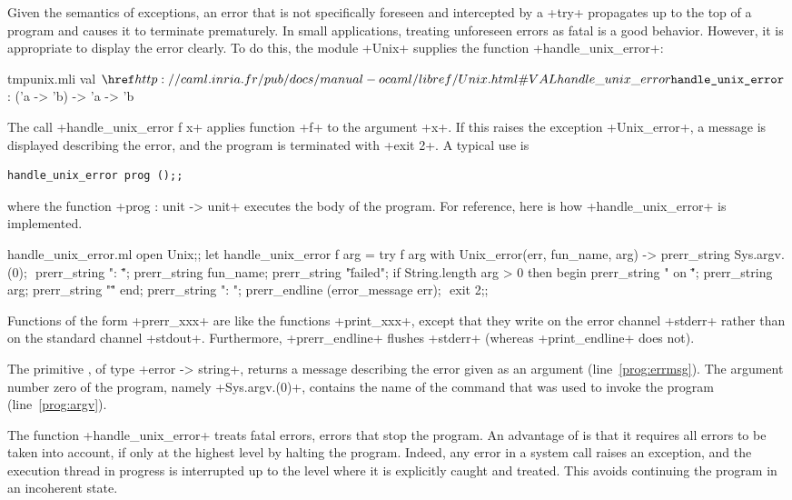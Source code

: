 Given the semantics of exceptions, an error that is not specifically
foreseen and intercepted by a \ml+try+ propagates up to the top of a
program and causes it to terminate prematurely.  In small
applications, treating unforeseen errors as fatal is a good behavior.
However, it is appropriate to display the error clearly. To do this,
the module \ml+Unix+ supplies the function \ml+handle_unix_error+:
%
\begin{listingcodefile}{tmpunix.mli}
val $\indexlibvalue{Unix}{handle\_unix\_error}$ : ('a -> 'b) -> 'a -> 'b
\end{listingcodefile}
%
The call  \ml+handle_unix_error f x+ applies function  \ml+f+ to the
argument \ml+x+. If this raises the exception \ml+Unix_error+, a
message is displayed describing the error, and the program is
terminated with  \ml+exit 2+. A typical use is
%
\begin{lstlisting}
handle_unix_error prog ();;
\end{lstlisting}
% 
where the function \ml+prog : unit -> unit+ executes the body of the
program. For reference, here is how \ml+handle_unix_error+ is
implemented.
%
\begin{listingcodefile}[style=numbers]{handle_unix_error.ml}
open Unix;;
let handle_unix_error f arg =
  try
    f arg
  with Unix_error(err, fun_name, arg) ->
    prerr_string Sys.argv.(0); $\label{prog:argv}$
    prerr_string ": \"";
    prerr_string fun_name;
    prerr_string "\" failed";
    if String.length arg > 0 then begin
      prerr_string " on \"";
      prerr_string arg;
      prerr_string "\""
    end;
    prerr_string ": ";
    prerr_endline (error_message err); $\label{prog:errmsg}$
    exit 2;;
\end{listingcodefile}
% 
Functions of the form \ml+prerr_xxx+ are like the functions
\ml+print_xxx+, except that they write on the error channel
\ml+stderr+ rather than on the standard channel \ml+stdout+.
Furthermore, \ml+prerr_endline+ flushes \ml+stderr+ (whereas
\ml+print_endline+ does not).

The primitive , of type 
\ml+error -> string+, returns a message describing the error given as an
argument (line~\ref{prog:errmsg}). The argument number zero of the
program, namely \ml+Sys.argv.(0)+, contains the name of the command
that was used to invoke the program (line~\ref{prog:argv}).

The function \ml+handle_unix_error+ treats fatal errors, \ie{} errors
that stop the program.  An advantage of {\ocaml} is that it requires
all errors to be taken into account, if only at the highest level by
halting the program. Indeed, any error in a system call raises an
exception, and the execution thread in progress is interrupted up to
the level where it is explicitly caught and treated. This avoids
continuing the program in an incoherent state.

